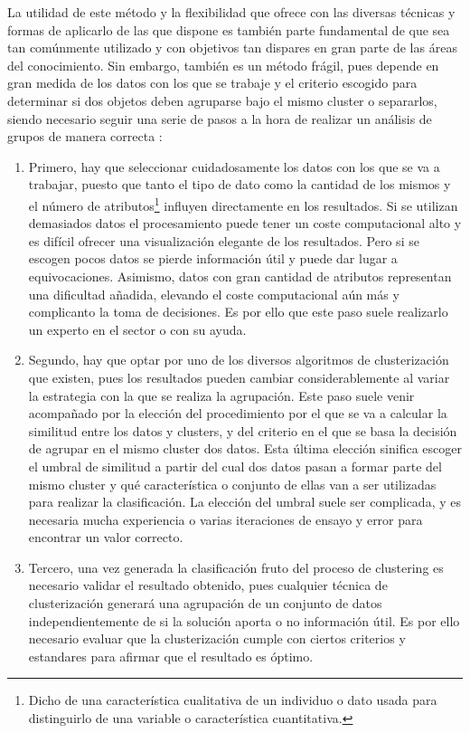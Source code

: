 \documentclass[10pt, a4paper]{article}
\begin{document}
La utilidad de este método y la flexibilidad que ofrece con las diversas técnicas y formas de aplicarlo de las que dispone es también parte fundamental de que sea tan comúnmente utilizado y con objetivos tan dispares en gran parte de las áreas del conocimiento. Sin embargo, también es un método frágil, pues depende en gran medida de los datos con los que se trabaje y el criterio escogido para determinar si dos objetos deben agruparse bajo el mismo cluster o separarlos, siendo necesario seguir una serie de pasos a la hora de realizar un análisis de grupos de manera correcta \cite{survey,15}:

\begin{enumerate}
  \item Primero, hay que seleccionar cuidadosamente los datos con los que se va a trabajar, puesto que tanto el tipo de dato como la cantidad de los mismos y el número de atributos\footnote{Dicho de una característica cualitativa de un individuo o dato usada para distinguirlo de una variable o característica cuantitativa.} influyen directamente en los resultados. Si se utilizan demasiados datos el procesamiento puede tener un coste computacional alto y es difícil ofrecer una visualización elegante de los resultados. Pero si se escogen pocos datos se pierde información útil y puede dar lugar a equivocaciones. Asimismo, datos con gran cantidad de atributos representan una dificultad añadida, elevando el coste computacional aún más y complicanto la toma de decisiones. Es por ello que este paso suele realizarlo un experto en el sector o con su ayuda. 
  
  \item Segundo, hay que optar por uno de los diversos algoritmos de clusterización que existen, pues los resultados pueden cambiar considerablemente al variar la estrategia con la que se realiza la agrupación. Este paso suele venir acompañado por la elección del procedimiento por el que se va a calcular la similitud entre los datos y clusters, y del criterio en el que se basa la decisión de agrupar en el mismo cluster dos datos. Esta última elección sinifica escoger el umbral de similitud a partir del cual dos datos pasan a formar parte del mismo cluster y qué característica o conjunto de ellas van a ser utilizadas para realizar la clasificación. La elección del umbral suele ser complicada, y es necesaria mucha experiencia o varias iteraciones de ensayo y error para encontrar un valor correcto. 
  
  \item Tercero, una vez generada la clasificación fruto del proceso de clustering es necesario validar el resultado obtenido, pues cualquier técnica de clusterización generará una agrupación de un conjunto de datos independientemente de si la solución aporta o no información útil. Es por ello necesario evaluar que la clusterización cumple con ciertos criterios y estandares para afirmar que el resultado es óptimo.
  

\end{enumerate}
\end{document}
